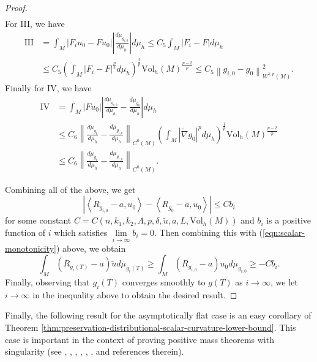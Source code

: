 \documentclass[12pt]{amsart}
\theoremstyle{plain}
\theoremstyle{plain}
\theoremstyle{definition}
\theoremstyle{remark}
\numberwithin{equation}{subsection}
\newcommand{\hdel}{\tilde{\nabla}}
\begin{document}
\begin{proof}
\begin{align*}
    \end{align*}
    For III, we have
    \begin{align*}
        \text{III} &= \int_M |F_iu_0 - Fu_0|\left|\frac{d\mu_{g_{i,0}}}{d\mu_h}\right|d\mu_h \leq C_5 \int_M |F_i - F|d\mu_h \nonumber \\
        &\leq C_5 \left(\int_M |F_i - F|^\frac{p}{2}d\mu_h\right)^\frac{2}{p}\text{Vol}_h(M)^\frac{p-2}{p} \leq C_5\left\lVert g_{i,0} - g_0\right\rVert_{W^{1,p}(M)}^2.
    \end{align*}
    Finally for IV, we have
    \begin{align*}
        \text{IV} &= \int_M |Fu_0|\left|\frac{d\mu_{g_{i,0}}}{d\mu_h} - \frac{d\mu_{g_0}}{d\mu_h}\right|d\mu_h \nonumber \\
        &\leq C_6\left\lVert \frac{d\mu_{g_0}}{d\mu_h} - \frac{d\mu_{g_{i,0}}}{d\mu_h}\right\rVert_{C^0(M)}\left(\int_M |\hdel g_0|^pd\mu_h\right)^\frac{1}{p}\text{Vol}_h(M)^\frac{p-2}{p} \nonumber \\
        &\leq C_6\left\lVert \frac{d\mu_{g_0}}{d\mu_h} - \frac{d\mu_{g_{i,0}}}{d\mu_h}\right\rVert_{C^0(M)}.
    \end{align*}

    Combining all of the above, we get
    \begin{equation*}
        \left|\left\langle R_{g_{i,0}}-a, u_0\right\rangle - \left\langle R_{g_0} - a, u_0\right\rangle \right| \leq Cb_i
    \end{equation*}
    for some constant $C = C(n,k_1,k_2,\Lambda,p,\delta,\tilde{u},a,L,\text{Vol}_h(M))$ and $b_i$ is a positive function of $i$ which satisfies $\lim\limits_{i\to\infty} b_i = 0$. Then combining this with (\ref{eqn:scalar-monotonicity}) above, we obtain
    \begin{equation*}
        \int_M (R_{g_i(T)}-a)\tilde{u}d\mu_{g_i(T)} \geq \int_M (R_{g_{i,0}}-a)u_0d\mu_{g_{i,0}} \geq -Cb_i.
    \end{equation*}
    Finally, observing that $g_i(T)$ converges smoothly to $g(T)$ as $i \to \infty$, we let $i \to \infty$ in the inequality above to obtain the desired result.
\end{proof}

Finally, the following result for the asymptotically flat case is an easy corollary of Theorem \ref{thm:preservation-distributional-scalar-curvature-lower-bound}. This case is important in the context of proving positive mass theorems with singularity (see \cite{miao_positive_2003}, \cite{lee_positive_2013}, \cite{lee_positive_2015}, \cite{shi_scalar_2016}, \cite{jiang_removable_2022}, \cite{lee_continuous_2021}, \cite{chu_ricci-deturck_2022} and references therein).
\end{document}
